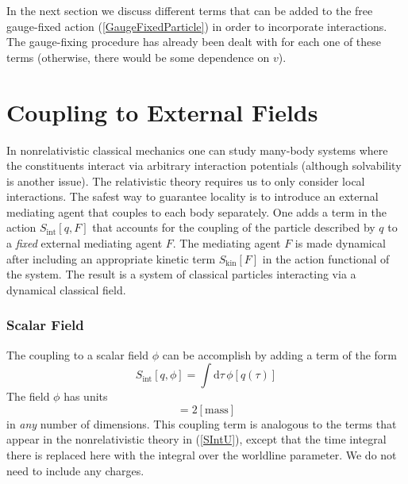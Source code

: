 In the next section we discuss different terms that can be added to the free gauge-fixed action (\ref{GaugeFixedParticle}) in order to incorporate interactions. The gauge-fixing procedure has already been dealt with for each one of these terms (otherwise, there would be some dependence on $v$).
\section{Coupling to External Fields}
In nonrelativistic classical mechanics one can study many-body systems where the constituents interact via arbitrary interaction potentials (although solvability is another issue). The relativistic theory requires us to only consider local interactions. The safest way to guarantee locality is to introduce an external mediating agent that couples to each body separately. One adds a term in the action $S_{\text{int}}[q, F]$ that accounts for the coupling of the particle described by $q$ to a \textit{fixed} external mediating agent $F$. The mediating agent $F$ is made dynamical after including an appropriate kinetic term $S_{\text{kin}}[F]$ in the action functional of the system. The result is a system of classical particles interacting via a dynamical classical field.
\subsubsection{Scalar Field}
The coupling to a scalar field $\phi$ can be accomplish by adding a term of the form
\begin{equation}
	S_{\text{int}}[q, \phi] = \int \mathrm{d}\tau \, \phi[q(\tau)] \label{CouplingPhi}
\end{equation}
The field $\phi$ has units
\begin{equation}
	[\phi] = 2 [\text{mass}]
\end{equation}
in \textit{any} number of dimensions. This coupling term is analogous to the terms that appear in the nonrelativistic theory in (\ref{SIntU}), except that the time integral there is replaced here with the integral over the worldline parameter. We do not need to include any charges.
